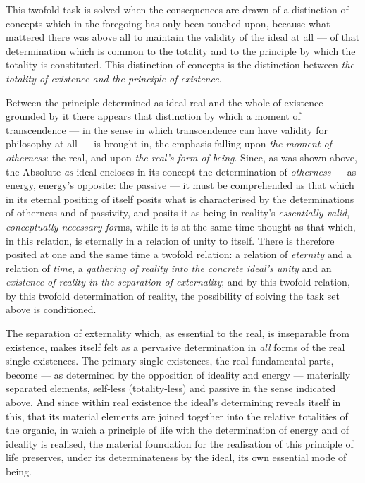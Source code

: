 \documentclass[12pt,a4paper]{book}
\begin{document}
This twofold task is solved when the consequences are drawn of a distinction of
concepts which in the foregoing has only been touched upon, because what
mattered there was above all to maintain the validity of the ideal at all ---
of that determination which is common to the totality and to the principle by
which the totality is constituted. This distinction of concepts is the
distinction between \emph{the totality of existence and the principle of
existence}.

Between the principle determined as ideal-real and the whole of existence
grounded by it there appears that distinction by which a moment of
transcendence --- in the sense in which transcendence can have validity for
philosophy at all --- is brought in, the emphasis falling upon \emph{the moment
of otherness}: the real, and upon \emph{the real's form of being}. Since, as
was shown above, the Absolute \emph{as} ideal encloses in its concept the
determination of \emph{otherness} --- as energy, energy's opposite: the passive
--- it must be comprehended as that which in its eternal positing of itself
posits what is characterised by the determinations of otherness and of
passivity,
and posits it as being in reality's \emph{essentially valid},
\emph{conceptually necessary for}ms, while it is at the same time thought as
that which, in this relation, is eternally in a relation of unity to itself.
There is therefore posited at one and the same time a twofold relation: a
relation of \emph{eternity} and a relation of \emph{time}, a \emph{gathering
of reality into the concrete ideal's unity} and an \emph{existence of reality
in the separation of externality}; and by this twofold relation, by this
twofold determination of reality, the possibility of solving the task set
above is conditioned.

The separation of externality which, as essential to the real, is inseparable
from existence, makes itself felt as a pervasive determination in \emph{all}
forms of the real single existences. The primary single existences, the real
fundamental parts, become --- as determined by the opposition of ideality and
energy --- materially separated elements, self-less (totality-less) and
passive in the sense indicated above. And since within real existence the
ideal's determining reveals itself in this, that its material elements are
joined together into the relative totalities of the organic, in which a
principle of life with the determination of energy and of ideality is
realised, the material foundation for the realisation of this principle of
life preserves, under its determinateness by the ideal, its own essential mode
of being.
\end{document}
